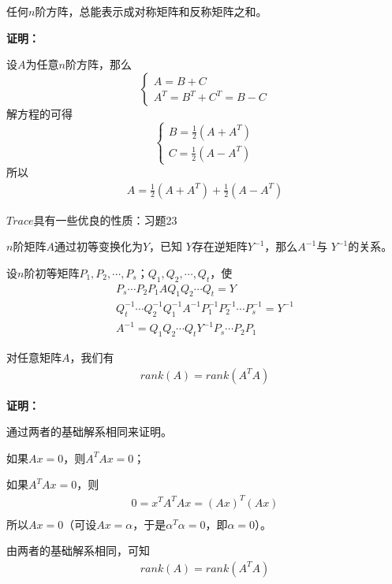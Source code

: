 \documentclass{article}
\begin{document}
\begin{zremark}
  任何$n$阶方阵，总能表示成对称矩阵和反称矩阵之和。
\end{zremark}

\textbf{证明：}

设$A$为任意$n$阶方阵，那么
\begin{equation*}
  \begin{cases*}
    A = B + C \\
    A^T = B^T + C^T = B - C
  \end{cases*}
\end{equation*}
解方程的可得
\begin{equation*}
  \begin{cases*}
    B = \frac{1}{2}(A + A^{T}) \\
    C = \frac{1}{2}(A - A^{T})
  \end{cases*}
\end{equation*}
所以
\begin{align*}
  A = \frac{1}{2}(A+A^{T}) + \frac{1}{2}(A-A^{T})
\end{align*}

\begin{zremark}
  $Trace$具有一些优良的性质：习题23
\end{zremark}

\begin{zremark}
  $n$阶矩阵$A$通过初等变换化为$Y$，已知
  $Y$存在逆矩阵$Y^{-1}$，那么$A^{-1}$与
  $Y^{-1}$的关系。
\end{zremark}

设$n$阶初等矩阵$P_1, P_2, \cdots, P_s$；$Q_1, Q_2, \cdots, Q_t$，使
\begin{align*}
  P_s \cdots P_2 P_1 A Q_1 Q_2 \cdots Q_t = Y                                         \\
  Q_t^{-1} \cdots Q_2^{-1} Q_1^{-1} A^{-1} P_1^{-1} P_2^{-1} \cdots P_s^{-1} = Y^{-1} \\
  A^{-1} = Q_1 Q_2 \cdots Q_t Y^{-1} P_s \cdots P_2P_1
\end{align*}

\begin{zremark}
  对任意矩阵$A$，我们有
  \begin{align*}
    rank(A) = rank(A^T A)
  \end{align*}
\end{zremark}

\textbf{证明：}

通过两者的基础解系相同来证明。

如果$Ax = 0$，则$A^T A x = 0$；

如果$A^T A x = 0$，则
\begin{align*}
  0 = x^T A^T A x = (A x)^T (A x) \\
\end{align*}
所以$Ax = 0$（可设$Ax = \alpha$，于是$\alpha^T \alpha = 0$，即$\alpha = 0$）。

由两者的基础解系相同，可知
\begin{align*}
  rank(A) = rank(A^T A)
\end{align*}
\end{document}
